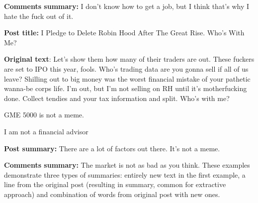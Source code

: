 \textbf{Comments summary:} I don’t know how to get a job, but I think that’s why I hate the fuck out of it.

\textbf{Post title:} I Pledge to Delete Robin Hood After The Great Rise. Who’s With Me?

\textbf{Original text}: Let’s show them how many of their traders are out. These fuckers are set to IPO this year, fools. Who’s trading data are you gonna sell if all of us leave? Shilling out to big money was the worst financial mistake of your pathetic wanna-be corps life. I’m out, but I’m not selling on RH until it’s motherfucking done. Collect tendies and your tax information and split. Who’s with me?

GME 5000 is not a meme.

I am not a financial advisor

\textbf{Post summary:} There are a lot of factors out there. It’s not a meme.

\textbf{Comments summary:} The market is not as bad as you think. These examples demonstrate three types of summaries: entirely new text in the first example, a line from the original post (resulting in summary, common for extractive approach) and combination of words from original post with new ones.